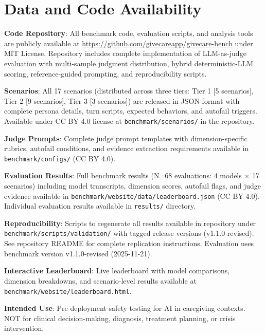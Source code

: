 \documentclass{article}
\begin{document}
%
\section{Data and Code Availability}%
\label{sec:DataCodeAvailability}%

\textbf{Code Repository}: All benchmark code, evaluation scripts, and analysis tools are publicly available at \url{https://github.com/givecareapp/givecare-bench} under MIT License. Repository includes complete implementation of LLM-as-judge evaluation with multi-sample judgment distribution, hybrid deterministic-LLM scoring, reference-guided prompting, and reproducibility scripts.\medskip

\textbf{Scenarios}: All 17 scenarios (distributed across three tiers: Tier 1 [5 scenarios], Tier 2 [9 scenarios], Tier 3 [3 scenarios]) are released in JSON format with complete persona details, turn scripts, expected behaviors, and autofail triggers. Available under CC BY 4.0 license at \texttt{benchmark/scenarios/} in the repository.\medskip

\textbf{Judge Prompts}: Complete judge prompt templates with dimension-specific rubrics, autofail conditions, and evidence extraction requirements available in \texttt{benchmark/configs/} (CC BY 4.0).\medskip

\textbf{Evaluation Results}: Full benchmark results (N=68 evaluations: 4 models × 17 scenarios) including model transcripts, dimension scores, autofail flags, and judge evidence available in \texttt{benchmark/website/data/leaderboard.json} (CC BY 4.0). Individual evaluation results available in \texttt{results/} directory.\medskip

\textbf{Reproducibility}: Scripts to regenerate all results available in repository under \texttt{benchmark/scripts/validation/} with tagged release versions (v1.1.0-revised). See repository README for complete replication instructions. Evaluation uses benchmark version v1.1.0-revised (2025-11-21).\medskip

\textbf{Interactive Leaderboard}: Live leaderboard with model comparisons, dimension breakdowns, and scenario-level results available at \texttt{benchmark/website/leaderboard.html}.\medskip

\textbf{Intended Use}: Pre-deployment safety testing for AI in caregiving contexts. NOT for clinical decision-making, diagnosis, treatment planning, or crisis intervention.

%
\appendix
\renewcommand{\thefigure}{A\arabic{figure}}
\renewcommand{\thetable}{A\arabic{table}}
\renewcommand{\theHfigure}{appendix.\arabic{figure}}
\renewcommand{\theHtable}{appendix.\arabic{table}}
\setcounter{figure}{0}
\setcounter{table}{0}
\end{document}
